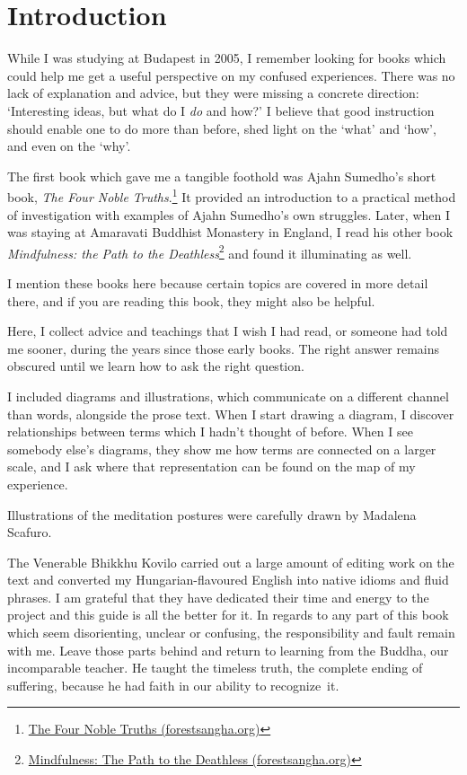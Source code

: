 \chapter{Introduction}

While I was studying at Budapest in 2005, I remember looking for books
which could help me get a useful perspective on my confused experiences.
There was no lack of explanation and advice, but they were missing a
concrete direction: `Interesting ideas, but what do I \emph{do} and
how?' I believe that good instruction should enable one to do more than
before, shed light on the `what' and `how', and even on the `why'.

The first book which gave me a tangible foothold was Ajahn Sumedho's
short book, \emph{The Four Noble Truths}.\footnote{\href{https://forestsangha.org/teachings/books/the-four-noble-truths?language=English}{The
  Four Noble Truths (forestsangha.org)}} It provided an introduction to
a practical method of investigation with examples of Ajahn Sumedho's own
struggles. Later, when I was staying at Amaravati Buddhist Monastery in
England, I read his other book \emph{Mindfulness: the Path to the
Deathless}\footnote{\href{https://forestsangha.org/teachings/books/mindfulness-the-path-to-the-deathless?language=English}{Mindfulness:
  The Path to the Deathless (forestsangha.org)}} and found it
illuminating as well.

I mention these books here because certain topics are covered in more
detail there, and if you are reading this book, they might also be
helpful.

Here, I collect advice and teachings that I wish I had read, or someone
had told me sooner, during the years since those early books. The right
answer remains obscured until we learn how to ask the right question.

I included diagrams and illustrations, which communicate on a different
channel than words, alongside the prose text. When I start drawing a
diagram, I discover relationships between terms which I hadn't thought
of before. When I see somebody else's diagrams, they show me how terms
are connected on a larger scale, and I ask where that representation can
be found on the map of my experience.

Illustrations of the meditation postures were carefully drawn by
Madalena Scafuro.

The Venerable Bhikkhu Kovilo carried out a large amount of editing work
on the text and converted my Hungarian-flavoured English into native
idioms and fluid phrases. I am grateful that they have dedicated their
time and energy to the project and this guide is all the better for it.
In regards to any part of this book which seem disorienting, unclear or
confusing, the responsibility and fault remain with me. Leave those
parts behind and return to learning from the Buddha, our incomparable
teacher. He taught the timeless truth, the complete ending of suffering,
because he had faith in our ability to recognize~it.


